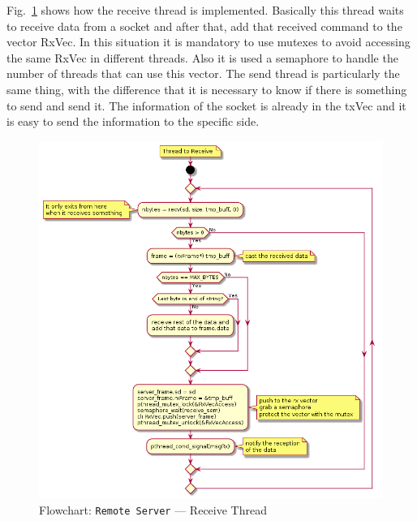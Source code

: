 Fig.~\ref{fig:flow-rs-recv} shows how the receive thread is implemented.
Basically this thread waits to receive data from a socket and after that, add that received command to the vector RxVec. In this situation it is mandatory to use mutexes to avoid accessing the same RxVec in different threads. Also it is used a semaphore to handle the number of threads that can use this vector.
The send thread is particularly the same thing, with the difference that it is necessary to know if there is something to send and send it. The information of the socket is already in the txVec and it is easy to send the information to the specific side.
%
\begin{figure}[htb!]
\centering
    \includegraphics[width=0.7\columnwidth]{./img/flow-rs-recv.png}
  \caption{Flowchart: \texttt{Remote Server} --- Receive Thread}%
\label{fig:flow-rs-recv}
\end{figure}

